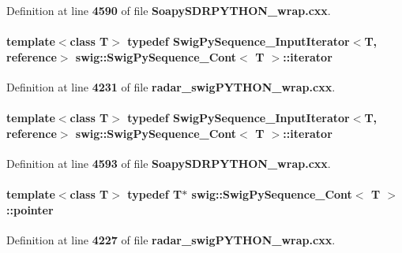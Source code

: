 Definition at line {\bf 4590} of file {\bf Soapy\+S\+D\+R\+P\+Y\+T\+H\+O\+N\+\_\+wrap.\+cxx}.

\paragraph[{iterator}]{\setlength{\rightskip}{0pt plus 5cm}template$<$class T$>$ typedef {\bf Swig\+Py\+Sequence\+\_\+\+Input\+Iterator}$<$T, {\bf reference}$>$ {\bf swig\+::\+Swig\+Py\+Sequence\+\_\+\+Cont}$<$ T $>$\+::{\bf iterator}}\label{structswig_1_1SwigPySequence__Cont_abcd331d0657a109f34c0fd84c5be87dd}


Definition at line {\bf 4231} of file {\bf radar\+\_\+swig\+P\+Y\+T\+H\+O\+N\+\_\+wrap.\+cxx}.

\paragraph[{iterator}]{\setlength{\rightskip}{0pt plus 5cm}template$<$class T$>$ typedef {\bf Swig\+Py\+Sequence\+\_\+\+Input\+Iterator}$<$T, {\bf reference}$>$ {\bf swig\+::\+Swig\+Py\+Sequence\+\_\+\+Cont}$<$ T $>$\+::{\bf iterator}}\label{structswig_1_1SwigPySequence__Cont_abcd331d0657a109f34c0fd84c5be87dd}


Definition at line {\bf 4593} of file {\bf Soapy\+S\+D\+R\+P\+Y\+T\+H\+O\+N\+\_\+wrap.\+cxx}.

\paragraph[{pointer}]{\setlength{\rightskip}{0pt plus 5cm}template$<$class T$>$ typedef T$\ast$ {\bf swig\+::\+Swig\+Py\+Sequence\+\_\+\+Cont}$<$ T $>$\+::{\bf pointer}}\label{structswig_1_1SwigPySequence__Cont_a168a126e49131e25b2616d411f71fb9a}


Definition at line {\bf 4227} of file {\bf radar\+\_\+swig\+P\+Y\+T\+H\+O\+N\+\_\+wrap.\+cxx}.

